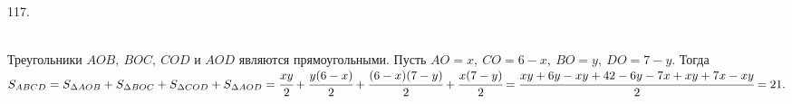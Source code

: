 117. \begin{figure}[ht!]
\end{figure}\\
Треугольники $AOB,\ BOC,\ COD$ и $AOD$ являются прямоугольными. Пусть $AO=x,\ CO=6-x,\ BO=y,\ DO=7-y.$ Тогда $S_{ABCD}=S_{\Delta AOB}+S_{\Delta BOC}+S_{\Delta COD}+S_{\Delta AOD}=\cfrac{xy}{2}+\cfrac{y(6-x)}{2}+\cfrac{(6-x)(7-y)}{2}+\cfrac{x(7-y)}{2}=\cfrac{xy+6y-xy+42-6y-7x+xy+7x-xy}{2}=21.$\\
